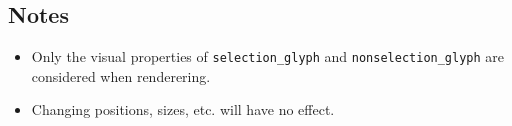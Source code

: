 \documentclass[a4paper,12pt]{article}
\begin{document}
\subsection{Notes}
\begin{itemize}
\item Only the visual properties of \texttt{selection\_glyph} and \texttt{nonselection\_glyph} are considered when renderering. 
\item Changing positions, sizes, etc. will have no effect.
\end{itemize}


\end{document}
